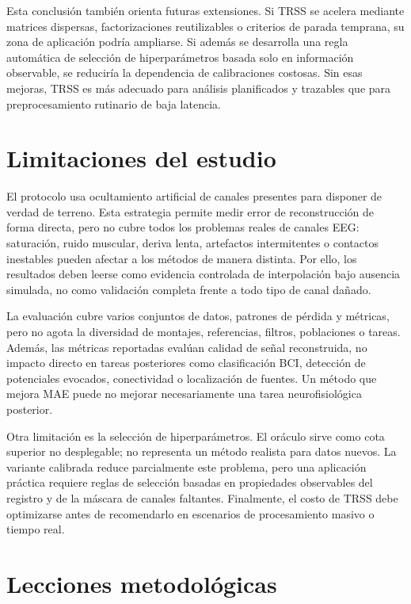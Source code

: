 Esta conclusión también orienta futuras extensiones. Si TRSS se acelera mediante matrices dispersas, factorizaciones reutilizables o criterios de parada temprana, su zona de aplicación podría ampliarse. Si además se desarrolla una regla automática de selección de hiperparámetros basada solo en información observable, se reduciría la dependencia de calibraciones costosas. Sin esas mejoras, TRSS es más adecuado para análisis planificados y trazables que para preprocesamiento rutinario de baja latencia.

\section{Limitaciones del estudio}

El protocolo usa ocultamiento artificial de canales presentes para disponer de verdad de terreno. Esta estrategia permite medir error de reconstrucción de forma directa, pero no cubre todos los problemas reales de canales EEG: saturación, ruido muscular, deriva lenta, artefactos intermitentes o contactos inestables pueden afectar a los métodos de manera distinta. Por ello, los resultados deben leerse como evidencia controlada de interpolación bajo ausencia simulada, no como validación completa frente a todo tipo de canal dañado.

La evaluación cubre varios conjuntos de datos, patrones de pérdida y métricas, pero no agota la diversidad de montajes, referencias, filtros, poblaciones o tareas. Además, las métricas reportadas evalúan calidad de señal reconstruida, no impacto directo en tareas posteriores como clasificación BCI, detección de potenciales evocados, conectividad o localización de fuentes. Un método que mejora MAE puede no mejorar necesariamente una tarea neurofisiológica posterior.

Otra limitación es la selección de hiperparámetros. El oráculo sirve como cota superior no desplegable; no representa un método realista para datos nuevos. La variante calibrada reduce parcialmente este problema, pero una aplicación práctica requiere reglas de selección basadas en propiedades observables del registro y de la máscara de canales faltantes. Finalmente, el costo de TRSS debe optimizarse antes de recomendarlo en escenarios de procesamiento masivo o tiempo real.

\section{Lecciones metodológicas}

